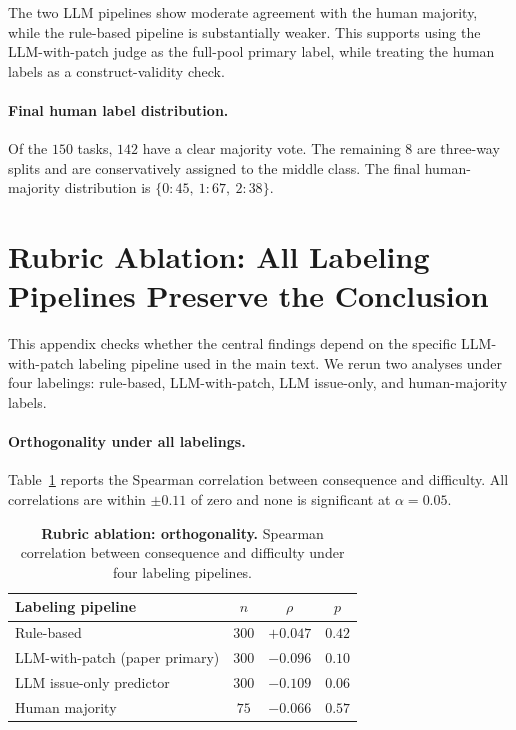 \documentclass{article}
\begin{document}
The two LLM pipelines show moderate agreement with the human majority,
while the rule-based pipeline is substantially weaker. This supports
using the LLM-with-patch judge as the full-pool primary label, while
treating the human labels as a construct-validity check.

\paragraph{Final human label distribution.}
Of the $150$ tasks, $142$ have a clear majority vote. The remaining
$8$ are three-way splits and are conservatively assigned to the middle
class. The final human-majority distribution is
$\{0{:}45,\ 1{:}67,\ 2{:}38\}$.

\section{Rubric Ablation: All Labeling Pipelines Preserve the Conclusion}
\label{app:rubric}

This appendix checks whether the central findings depend on the
specific LLM-with-patch labeling pipeline used in the main text. We
rerun two analyses under four labelings: rule-based, LLM-with-patch,
LLM issue-only, and human-majority labels.

\paragraph{Orthogonality under all labelings.}
Table~\ref{tab:abl-ortho} reports the Spearman correlation between
consequence and difficulty. All correlations are within $\pm0.11$ of
zero and none is significant at $\alpha=0.05$.

\begin{table}[h]
\centering
\caption{\textbf{Rubric ablation: orthogonality.} Spearman correlation
between consequence and difficulty under four labeling pipelines.}
\label{tab:abl-ortho}
\small
\begin{tabular}{lccc}
\toprule
Labeling pipeline & $n$ & $\rho$ & $p$ \\
\midrule
Rule-based & $300$ & $+0.047$ & $0.42$ \\
LLM-with-patch (paper primary) & $300$ & $-0.096$ & $0.10$ \\
LLM issue-only predictor & $300$ & $-0.109$ & $0.06$ \\
Human majority & $75$ & $-0.066$ & $0.57$ \\
\bottomrule
\end{tabular}
\end{table}
\end{document}
